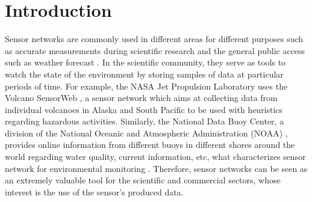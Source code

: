 



\chapter{Introduction}

Sensor networks are commonly used in different areas for different purposes
such as accurate measurements during scientific research \cite{sn-intro01} and
the general public access such as weather forecast \cite{sn-intro02}. In the
scientific community, they serve as tools to watch the state of the environment
by storing samples of data at particular periods of time. For example, the
NASA Jet Propulsion Laboratory uses the Volcano SensorWeb \cite{sn-ex02}, a
sensor network which aims at collecting data from individual volcanoes in
Alaska and South Pacific to be used with heuristics regarding hazardous
activities. Similarly, the National Data Buoy Center, a division of the
National Oceanic and Atmospheric Administration (NOAA) \cite{sn-ex03},
provides online information from different buoys in different shores around
the world regarding water quality, current information, etc, what
characterizes sensor network for environmental monitoring \cite{sn-ex01}.
Therefore, sensor networks can be seen as an extremely valuable tool
for the scientific and commercial sectors, whose interest is the use of
the sensor's produced data.

